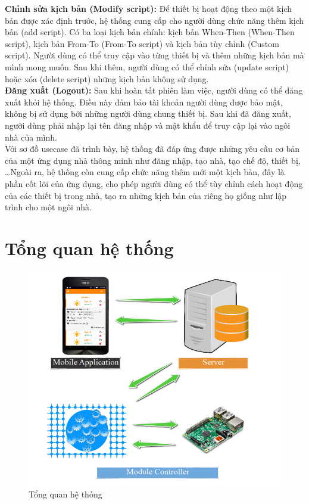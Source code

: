 \documentclass[12pt,a4paper,oneside]{extbook}
\begin{document}
\noindent
\textbf{Chỉnh sửa kịch bản (Modify script):} Để thiết bị hoạt động theo một kịch bản được xác định trước, hệ thống cung cấp cho người dùng chức năng thêm kịch bản (add script). Có ba loại kịch bản chính: kịch bản When-Then (When-Then script), kịch bản From-To (From-To script) và kịch bản tùy chỉnh (Custom script). Người dùng có thể truy cập vào từng thiết bị và thêm những kịch bản mà mình mong muốn. Sau khi thêm, người dùng có thể chỉnh sửa (update script) hoặc xóa (delete script) những kịch bản không sử dụng.
\\

\noindent
\textbf{Đăng xuất (Logout):} Sau khi hoàn tất phiên làm việc, người dùng có thể đăng xuất khỏi hệ thống. Điều này đảm bảo tài khoản người dùng được bảo mật, không bị sử dụng bởi những người dùng chung thiết bị. Sau khi đã đăng xuất, người dùng phải nhập lại tên đăng nhập và mật khẩu để truy cập lại vào ngôi nhà của mình.\\

\noindent
Với sơ đồ usecase đã trình bày, hệ thống đã đáp ứng được những yêu cầu cơ bản của một ứng dụng nhà thông minh như đăng nhập, tạo nhà, tạo chế độ, thiết bị, …Ngoài ra, hệ thống còn cung cấp chức năng thêm mới một kịch bản, đây là phần cốt lõi của ứng dụng, cho phép người dùng có thể tùy chỉnh cách hoạt động của các thiết bị trong nhà, tạo ra những kịch bản của riêng họ giống như lập trình cho một ngôi nhà.

\section{Tổng quan hệ thống}

\begin{figure}[h!]
  \centering
     \includegraphics[width=12cm]{2-overview}
  \caption{Tổng quan hệ thống}\label{fig:2-overview}
\end{figure}
\end{document}
